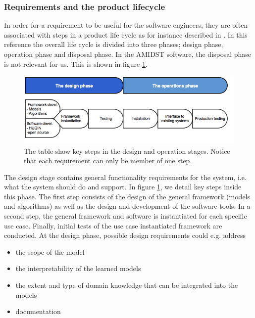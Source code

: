 \documentclass[11pt, oneside]{article}   	%
\begin{document}
\subsubsection*{Requirements and the product lifecycle}

In order for a requirement to be useful for the software engineers, they are often associated with steps in a product life cycle as for instance described in \cite{Eig09}.  In this reference the overall life cycle is divided into three phases; design phase, operation phase and disposal phase.  In the AMIDST software, the disposal phase is not relevant for us.  This is shown in figure \ref{REprocess2}.

\begin{figure}
\centering
\includegraphics [keepaspectratio,width = 14cm] {REprocess2}
\caption{The table show key steps in the design and operation stages. Notice that each requirement can only be member of one step.} 
\label{REprocess2}
\end{figure}

The design stage contains general functionality requirements for the system, i.e. what the system should do and support.  In figure \ref{REprocess2}, we detail key steps inside this phase. The first step consists of the design of the general framework (models and algorithms) as well as the design and development of the software tools. In a second step, the general framework and software is instantiated for each specific use case. Finally, initial tests of the use case instantiated framework are conducted.  At the design phase, possible design requirements could e.g. address
\begin{itemize}
 \item the scope of the model
 \item the interpretability of the learned models
 \item the extent and type of domain knowledge that can be integrated into the models
 \item documentation
\end{itemize}
\end{document}
